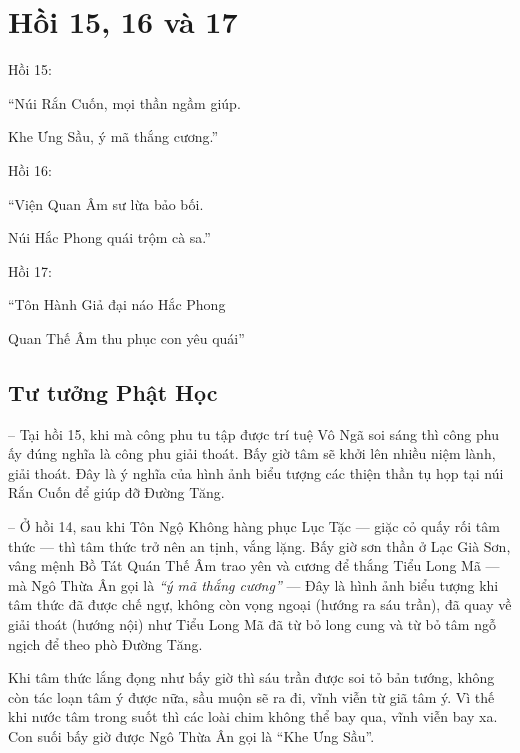 \chapter{Hồi 15, 16 và 17} %
\label{cha:hoi_15_16_17}

Hồi 15:

\begin{itshape}
``Núi Rắn Cuốn, mọi thần ngầm giúp.

Khe Ưng Sầu, ý mã thắng cương.''
\end{itshape}

Hồi 16:

\begin{itshape}
``Viện Quan Âm sư lừa bảo bối.

Núi Hắc Phong quái trộm cà sa.''
\end{itshape}

Hồi 17:

\begin{itshape}
``Tôn Hành Giả đại náo Hắc Phong

Quan Thế Âm thu phục con yêu quái''
\end{itshape}

\section{Tư tưởng Phật Học} %
\label{sec:15_phat_hoc}

-- Tại hồi 15, khi mà công phu tu tập được trí tuệ Vô Ngã soi sáng thì công phu ấy đúng nghĩa là công phu giải thoát. Bấy giờ tâm sẽ khởi lên nhiều niệm lành, giải thoát. Đây là ý nghĩa của hình ảnh biểu tượng các thiện thần tụ họp tại núi Rắn Cuốn để giúp đỡ Đường Tăng.

-- Ở hồi 14, sau khi Tôn Ngộ Không hàng phục Lục Tặc --- giặc cỏ quấy rối tâm thức --- thì tâm thức trở nên an tịnh, vắng lặng. Bấy giờ sơn thần ở Lạc Già Sơn, vâng mệnh Bồ Tát Quán Thế Âm trao yên và cương để thắng Tiểu Long Mã --- mà Ngô Thừa Ân gọi là \emph{``ý mã thắng cương''} --- Đây là hình ảnh biểu tượng khi tâm thức đã được chế ngự, không còn vọng ngoại (hướng ra sáu trần), đã quay về giải thoát (hướng nội) như Tiểu Long Mã đã từ bỏ long cung và từ bỏ tâm ngỗ ngịch để theo phò Đường Tăng.

Khi tâm thức lắng đọng như bấy giờ thì sáu trần được soi tỏ bản tướng, không còn tác loạn tâm ý được nữa, sầu muộn sẽ ra đi, vĩnh viễn từ giã tâm ý. Vì thế khi nước tâm trong suốt thì các loài chim không thể bay qua, vĩnh viễn bay xa. Con suối bấy giờ được Ngô Thừa Ân gọi là ``Khe Ưng Sầu''.

